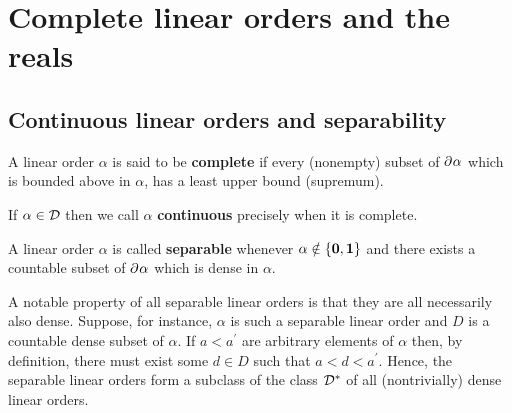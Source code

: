 
\chapter{Complete linear orders and the reals}

\section{Continuous linear orders and separability}

\begin{dfn}[Completeness]
	A linear order $\alpha$ is said to be \textbf{complete} if every (nonempty)
	subset of $\partial^{}{\alpha}$ which is bounded above in $\alpha$, has a least upper
	bound (supremum).
\end{dfn}

\begin{dfn}
	If $\alpha\in\mathcal{D}$ then we call $\alpha$ \textbf{continuous} precisely when it is complete.
\end{dfn}

\begin{dfn}[Separable]
	A linear order $\alpha$ is called \textbf{separable} whenever
	$\alpha\notin\left\lbrace \mathbf{0},\mathbf{1}\right\rbrace$ and there exists a countable subset of
	$\partial^{}{}\alpha$ which is dense in $\alpha$.
\end{dfn}

A notable property of all separable linear orders is that they are all
necessarily also dense.  Suppose, for instance, $\alpha$ is such a separable
linear order and $D$ is a countable dense subset of $\alpha$.  If $a<a^{\prime}$
are arbitrary elements of $\alpha$ then, by definition, there must exist some
$d\in D$ such that $a<d<a^{\prime}$.  Hence, the separable linear orders form a
subclass of the class $\mathcal{D}^\ast$ of all (nontrivially) dense linear orders.

